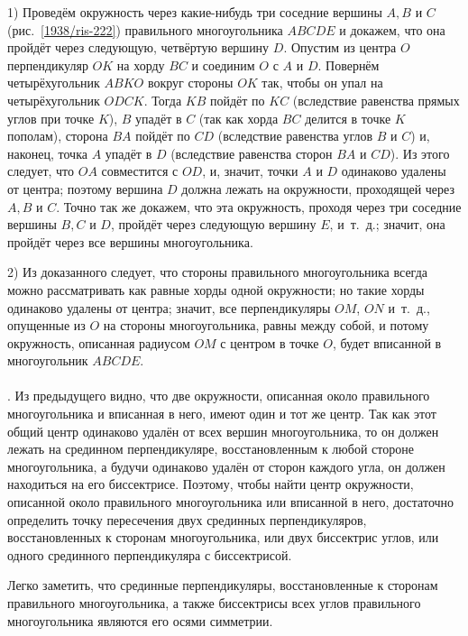 1) Проведём окружность через какие-нибудь три соседние вершины $A, B$ и $C$ (рис.~\ref{1938/ris-222}) правильного многоугольника $ABCDE$ и докажем, что она пройдёт через следующую, четвёртую вершину $D$.
Опустим из центра $O$ перпендикуляр $OK$ на хорду $BC$ и соединим $O$ с $A$ и $D$.
Повернём четырёхугольник $ABKO$ вокруг стороны $OK$ так, чтобы он упал на четырёхугольник $ODCK$.
Тогда $KB$ пойдёт по $KC$ (вследствие равенства прямых углов при точке $K$), 
$B$ упадёт в $C$ (так как хорда $BC$ делится в точке $K$ пополам), 
сторона $BA$ пойдёт по $CD$ (вследствие равенства углов $B$ и $C$)
и, наконец, точка $A$ упадёт в $D$ (вследствие равенства сторон $BA$ и $CD$).
Из этого следует, что $OA$ совместится с $OD$, и, значит, точки $A$ и $D$ одинаково удалены от центра;
поэтому вершина $D$ должна лежать на окружности, проходящей через $A, B$ и $C$.
Точно так же докажем, что эта окружность, проходя через три соседние вершины $B, C$ и $D$, пройдёт через следующую вершину $E$, и~т.~д.;
значит, она пройдёт через все вершины многоугольника.

2) Из доказанного следует, что стороны правильного многоугольника всегда можно рассматривать как равные хорды одной окружности;
но такие хорды одинаково удалены от центра;
значит, все перпендикуляры $OM$, $ON$ и~т.~д., опущенные из $O$ на стороны многоугольника, равны между собой, и потому окружность, описанная радиусом $OM$ с центром в точке $O$, будет вписанной в многоугольник $ABCDE$.

\paragraph{}\label{1938/216}
.
Из предыдущего видно, что две окружности, описанная около правильного многоугольника и вписанная в него, имеют один и тот же центр.
Так как этот общий центр одинаково удалён от всех вершин многоугольника, то он должен лежать на срединном перпендикуляре, восстановленным к любой стороне многоугольника, а будучи одинаково удалён от сторон каждого угла, он должен находиться на его биссектрисе.
Поэтому, чтобы найти центр окружности, описанной около правильного многоугольника или вписанной в него, достаточно определить точку пересечения двух срединных перпендикуляров, восстановленных к сторонам многоугольника, или двух биссектрис углов, или одного срединного перпендикуляра с биссектрисой.

Легко заметить, что срединные перпендикуляры, восстановленные к сторонам правильного многоугольника, а также биссектрисы всех углов правильного многоугольника являются его осями симметрии.

